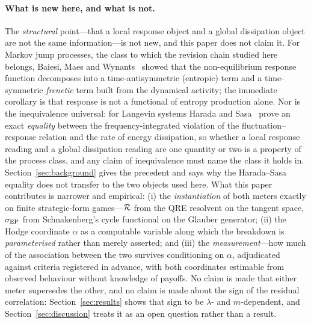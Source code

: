 \paragraph{What is new here, and what is not.} The \emph{structural} point---that a local
response object and a global dissipation object are not the same information---is not new,
and this paper does not claim it. For Markov jump processes, the class to which the revision
chain studied here belongs, Baiesi, Maes and Wynants~\cite{baiesi2009} showed that the
non-equilibrium response function decomposes into a time-antisymmetric (entropic) term and a
time-symmetric \emph{frenetic} term built from the dynamical activity; the immediate
corollary is that response is not a functional of entropy production alone. Nor is the
inequivalence universal: for Langevin systems Harada and Sasa~\cite{haradasasa2005} prove an
exact \emph{equality} between the frequency-integrated violation of the
fluctuation--response relation and the rate of energy dissipation, so whether a local
response reading and a global dissipation reading are one quantity or two is a property of
the process class, and any claim of inequivalence must name the class it holds in.
Section~\ref{sec:background} gives the precedent and says why the Harada--Sasa equality does
not transfer to the two objects used here. What this paper contributes is narrower and
empirical: (i) the \emph{instantiation} of both meters exactly on finite strategic-form
games---$\mathcal{R}$ from the QRE resolvent on the tangent space, $\sigma_{\mathrm{EP}}$ from Schnakenberg's cycle
functional on the Glauber generator; (ii) the Hodge coordinate $\alpha$ as a computable
variable along which the breakdown is \emph{parameterised} rather than merely asserted; and
(iii) the \emph{measurement}---how much of the association between the two survives
conditioning on $\alpha$, adjudicated against criteria registered in advance, with both
coordinates estimable from observed behaviour without knowledge of payoffs. No claim is
made that either meter supersedes the other, and no claim is made about the sign of the
residual correlation: Section~\ref{sec:results} shows that sign to be $\lambda$- and
$m$-dependent, and Section~\ref{sec:discussion} treats it as an open question rather than a
result.

